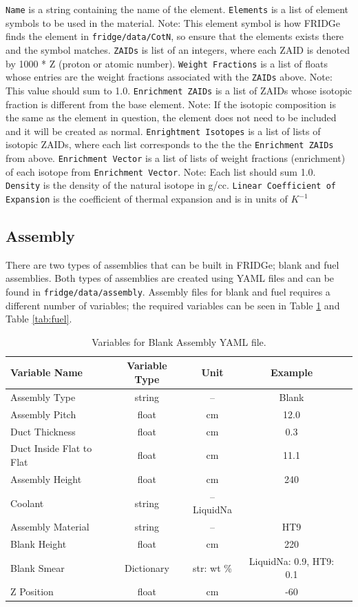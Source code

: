 \documentclass{article}
\begin{document}
\verb|Name| is a string containing the name of the element. \verb|Elements| is a list of element symbols to be used in the material. Note: This element symbol is how FRIDGe finds the element in \verb|fridge/data/CotN|, so ensure that the elements exists there and the symbol matches.
\verb|ZAIDs| is list of an integers, where each ZAID is denoted by 1000 * Z (proton or atomic number). \verb|Weight Fractions| is a list of floats whose entries are the weight fractions associated with the \verb|ZAIDs| above. Note: This value should sum to 1.0. \verb|Enrichment ZAIDs| is a list of ZAIDs whose isotopic fraction is different from the base element. Note: If the isotopic composition is the same as the element in question, the element does not need to be included and it will be created as normal. \verb|Enrightment Isotopes| is a list of lists of isotopic ZAIDs, where each list corresponds to the the the \verb|Enrichment ZAIDs| from above. \verb|Enrichment Vector| is a list of lists of weight fractions (enrichment) of each isotope from \verb|Enrichment Vector|. Note: Each list should sum 1.0. \verb|Density| is the density of the natural isotope in g/cc. \verb|Linear Coefficient of Expansion| is the coefficient of thermal expansion and is in units of $K^{-1}$

\subsection{Assembly}

There are two types of assemblies that can be built in FRIDGe; blank and fuel assemblies. Both types of assemblies are created using YAML files and can be found in \verb|fridge/data/assembly|. Assembly files for blank and fuel requires a different number of variables; the required variables can be seen in Table \ref{tab:blank} and Table \ref{tab:fuel}.

\begin{table}
	\centering
	\caption{Variables for Blank Assembly YAML file.}
	\begin{tabular}{lcccc}\toprule
		Variable Name   & Variable Type & Unit & Example 
		\\
		\hline
		Assembly Type  & string & -- & Blank
		\\
		Assembly Pitch & float  & cm & 12.0
		\\		
		Duct Thickness & float & cm & 0.3
		\\
	    Duct Inside Flat to Flat & float & cm & 11.1
		\\
		Assembly Height & float & cm & 240
		\\
		Coolant & string & -- LiquidNa
		\\
		Assembly Material & string & -- & HT9
		\\		
		Blank Height & float & cm & 220
		\\
		Blank Smear & Dictionary & {str: wt \%} & {LiquidNa: 0.9, HT9: 0.1}
		\\
		Z Position & float & cm & -60
		\\
		\bottomrule
	\end{tabular}
	\label{tab:blank}
\end{table}
\end{document}
